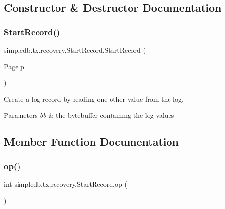 \subsection{Constructor \& Destructor Documentation}
\mbox{\label{classsimpledb_1_1tx_1_1recovery_1_1StartRecord_ab1ed9daa86a924274c0d2bf0f569450d}} 
\subsubsection{\texorpdfstring{Start\+Record()}{StartRecord()}}
{\footnotesize\ttfamily simpledb.\+tx.\+recovery.\+Start\+Record.\+Start\+Record (\begin{DoxyParamCaption}\item[{\hyperlink{classsimpledb_1_1file_1_1Page}{Page}}]{p }\end{DoxyParamCaption})\hspace{0.3cm}{\ttfamily [inline]}}

Create a log record by reading one other value from the log. 
\begin{DoxyParams}{Parameters}
{\em bb} & the bytebuffer containing the log values \\
\hline
\end{DoxyParams}


\subsection{Member Function Documentation}
\mbox{\label{classsimpledb_1_1tx_1_1recovery_1_1StartRecord_a528df40fb41199ed19510524aa0a8044}} 
\subsubsection{\texorpdfstring{op()}{op()}}
{\footnotesize\ttfamily int simpledb.\+tx.\+recovery.\+Start\+Record.\+op (\begin{DoxyParamCaption}{ }\end{DoxyParamCaption})\hspace{0.3cm}{\ttfamily [inline]}}

